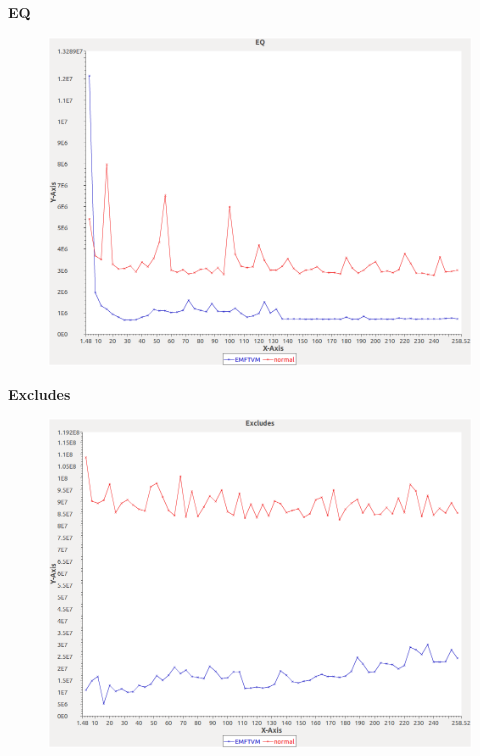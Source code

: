 \noindent\textbf{EQ}

\begin{figure}[h]
\centering
\includegraphics[width=\textwidth]{graphs/sequence/EQ}
\end{figure}
\pagebreak

\noindent\textbf{Excludes}

\begin{figure}[h]
\centering
\includegraphics[width=\textwidth]{graphs/sequence/Excludes}
\end{figure}
\pagebreak

